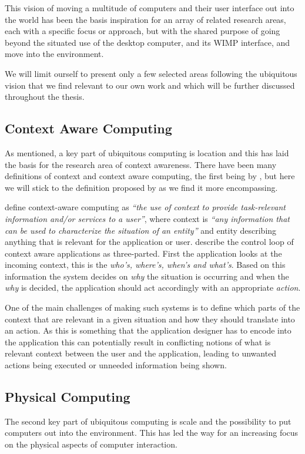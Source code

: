 This vision of moving a multitude of computers and their user interface out into the world has been the basis inspiration for an array of related research areas, each with a specific focus or approach, but with the shared purpose of going beyond the situated use of the desktop computer, and its WIMP interface, and move into the environment.

We will limit ourself to present only a few selected areas following the ubiquitous vision that we find relevant to our own work and which will be further discussed throughout the thesis.

\subsection{Context Aware Computing}
As mentioned, a key part of ubiquitous computing is location and this has laid the basis for the research area of context awareness.
There have been many definitions of context and context aware computing, the first being by \citet{schilit1994context}, but here we will stick to the definition proposed by \citet{abowd1999towards} as we find it more encompassing. 

\citet{abowd1999towards} define context-aware computing as \emph{``the use of context to
provide task-relevant information and/or services to a user''}, where context is \emph{``any information that can be used to characterize the situation of an entity''} and entity describing anything that is relevant for the application or user.
\citeauthor{abowd1999towards} describe the control loop of context aware applications as three-parted. 
First the application looks at the incoming context, this is the \emph{who's, where's, when's and what's}.
Based on this information the system decides on \emph{why} the situation is occurring and when the \emph{why} is decided, the application should act accordingly with an appropriate \emph{action}.

One of the main challenges of making such systems is to define which parts of the context that are relevant in a given situation and how they should translate into an action. 
As this is something that the application designer has to encode into the application this can potentially result in conflicting notions of what is relevant context between the user and the application, leading to unwanted actions being executed or unneeded information being shown.

\subsection{Physical Computing}
\label{interfaces:physical_computing}
The second key part of ubiquitous computing is scale and the possibility to put computers out into the environment.
This has led the way for an increasing focus on the physical aspects of computer interaction.

